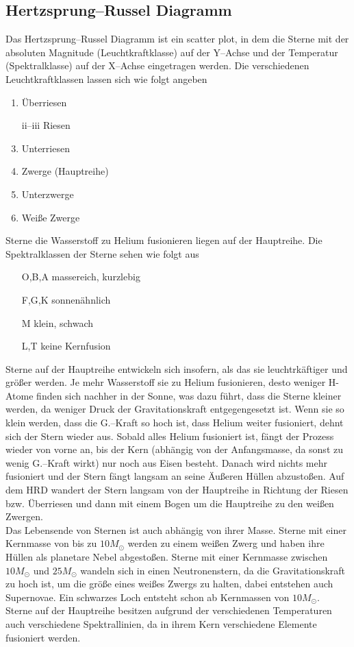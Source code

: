 \documentclass[a4paper,12pt]{article}
\begin{document}
\subsection{Hertzsprung--Russel Diagramm}
Das Hertzsprung--Russel Diagramm ist ein scatter plot, in dem die Sterne mit der absoluten Magnitude (Leuchtkraftklasse) auf der Y--Achse und der Temperatur (Spektralklasse) auf der X--Achse eingetragen werden. Die verschiedenen Leuchtkraftklassen lassen sich wie folgt angeben
\begin{enumerate}[label=\roman*]
        \item Überriesen
        \item[ii--iii]Riesen
        \addtocounter{enumi}{2}
        \item Unterriesen
        \item Zwerge (Hauptreihe)
        \item Unterzwerge
        \item Weiße Zwerge
\end{enumerate}
Sterne die Wasserstoff zu Helium fusionieren liegen auf der Hauptreihe. Die Spektralklassen der Sterne sehen wie folgt aus
\begin{enumerate}[label=]
        \item[\tiny{O,B,A}]massereich, kurzlebig
        \item[\tiny{F,G,K}]sonnenähnlich
        \item[\tiny{M}]klein, schwach 
        \item[\tiny{L,T}]keine Kernfusion
\end{enumerate}
Sterne auf der Hauptreihe entwickeln sich insofern, als das sie leuchtrkäftiger und größer werden. Je mehr Wasserstoff sie zu Helium fusionieren, desto weniger H-Atome finden sich nachher in der Sonne, was dazu führt, dass die Sterne kleiner werden, da weniger Druck der Gravitationskraft entgegengesetzt ist. Wenn sie so klein werden, dass die G.--Kraft so hoch ist, dass Helium weiter fusioniert, dehnt sich der Stern wieder aus. Sobald alles Helium fusioniert ist, fängt der Prozess wieder von vorne an, bis der Kern (abhängig von der Anfangsmasse, da sonst zu wenig G.--Kraft wirkt) nur noch aus Eisen besteht. Danach wird nichts mehr fusioniert und der Stern fängt langsam an seine Äußeren Hüllen abzustoßen. Auf dem HRD wandert der Stern langsam von der Hauptreihe in Richtung der Riesen bzw. Überriesen und dann mit einem Bogen um die Hauptreihe zu den weißen Zwergen.\\\indent
Das Lebensende von Sternen ist auch abhängig von ihrer Masse. Sterne mit einer Kernmasse von bis zu $10M_{\odot}$ werden zu einem weißen Zwerg und haben ihre Hüllen als planetare Nebel abgestoßen. Sterne mit einer Kernmasse zwischen $10M_{\odot}$ und $25M_{\odot}$ wandeln sich in einen Neutronenstern, da die Gravitationskraft zu hoch ist, um die größe eines weißes Zwergs zu halten, dabei entstehen auch Supernovae. Ein schwarzes Loch entsteht schon ab Kernmassen von $10M_{\odot}$.\\\indent
Sterne auf der Hauptreihe besitzen aufgrund der verschiedenen Temperaturen auch verschiedene Spektrallinien, da in ihrem Kern verschiedene Elemente fusioniert werden.
\end{document}
